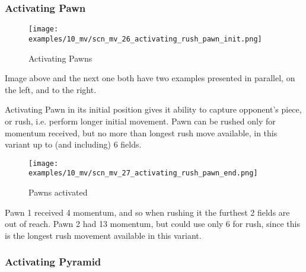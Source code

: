 \clearpage %

\subsubsection*{Activating Pawn}

\vspace*{-1.4\baselineskip}
\noindent
\begin{figure}[!h]
\texttt{[image: examples/10\_mv/scn\_mv\_26\_activating\_rush\_pawn\_init.png]}
\vspace*{-1.3\baselineskip}
\caption{Activating Pawns}
\label{fig:scn_mv_26_activating_rush_pawn_init}
\end{figure}

\vspace*{-0.3\baselineskip}
Image above and the next one both have two examples presented in parallel, on the left,
and to the right.

Activating Pawn in its initial position gives it ability to capture opponent's
piece, or rush, i.e. perform longer initial movement. Pawn can be rushed only for
momentum received, but no more than longest rush move available, in this variant
up to (and including) 6 fields.

\clearpage %

\vspace*{-2.1\baselineskip}
\noindent
\begin{figure}[!h]
\texttt{[image: examples/10\_mv/scn\_mv\_27\_activating\_rush\_pawn\_end.png]}
\caption{Pawns activated}
\label{fig:scn_mv_27_activating_rush_pawn_end}
\end{figure}

Pawn 1 received 4 momentum, and so when rushing it the furthest 2 fields are out
of reach. Pawn 2 had 13 momentum, but could use only 6 for rush, since this is the
longest rush movement available in this variant.

\clearpage %

\subsubsection*{Activating Pyramid}

